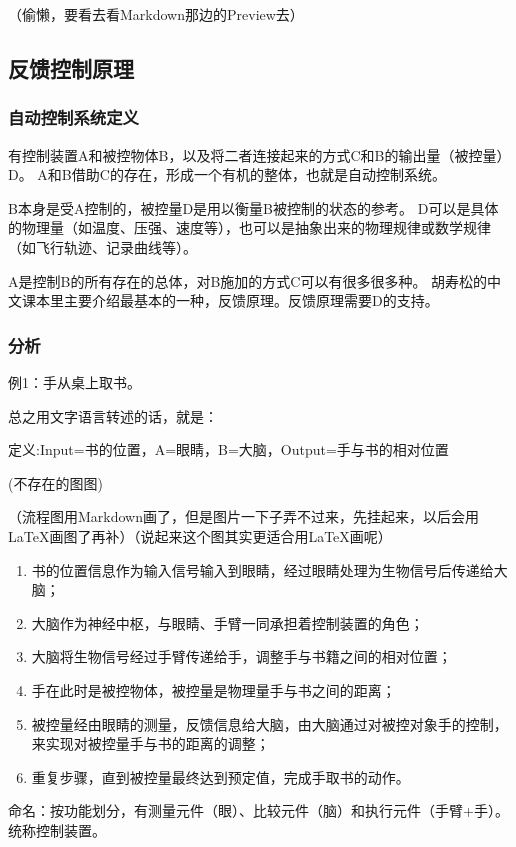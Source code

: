 \documentclass[oneside,a4paper]{ctexbook}
\begin{document}
（偷懒，要看去看Markdown那边的Preview去）

\subsection{反馈控制原理}
\subsubsection{自动控制系统定义}
有控制装置A和被控物体B，以及将二者连接起来的方式C和B的输出量（被控量）D。
A和B借助C的存在，形成一个有机的整体，也就是自动控制系统。

B本身是受A控制的，被控量D是用以衡量B被控制的状态的参考。
D可以是具体的物理量（如温度、压强、速度等），也可以是抽象出来的物理规律或数学规律（如飞行轨迹、记录曲线等）。

A是控制B的所有存在的总体，对B施加的方式C可以有很多很多种。
胡寿松的中文课本里主要介绍最基本的一种，反馈原理。反馈原理需要D的支持。
\subsubsection{分析}
例1：手从桌上取书。

总之用文字语言转述的话，就是：

定义:Input=书的位置，A=眼睛，B=大脑，Output=手与书的相对位置

    (不存在的图图)%
    
    （流程图用Markdown画了，但是图片一下子弄不过来，先挂起来，以后会用LaTeX画图了再补）（说起来这个图其实更适合用\LaTeX 画呢）

\begin{enumerate}    
    \item 书的位置信息作为输入信号输入到眼睛，经过眼睛处理为生物信号后传递给大脑；
    \item 大脑作为神经中枢，与眼睛、手臂一同承担着控制装置的角色；
    \item 大脑将生物信号经过手臂传递给手，调整手与书籍之间的相对位置；
    \item 手在此时是被控物体，被控量是物理量手与书之间的距离；
    \item 被控量经由眼睛的测量，反馈信息给大脑，由大脑通过对被控对象手的控制，来实现对被控量手与书的距离的调整；
    \item 重复步骤，直到被控量最终达到预定值，完成手取书的动作。
\end{enumerate}

命名：按功能划分，有测量元件（眼）、比较元件（脑）和执行元件（手臂+手）。统称控制装置。
\end{document}
